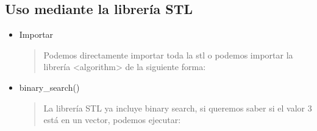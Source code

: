 \documentclass[letterpaper,10pt,spanish]{sphinxmanual}
\begin{document}
\subsection{Uso mediante la librería STL}
\label{\detokenize{busqueda/binaria:uso-mediante-la-libreria-stl}}\begin{itemize}
\item {} 
Importar
\begin{quote}

Podemos directamente importar toda la stl o podemos importar la
librería \textless{}algorithm\textgreater{} de la siguiente forma:
\end{quote}

\end{itemize}

\begin{sphinxVerbatim}[commandchars=\\\{\},numbers=left,firstnumber=1,stepnumber=1]
 
\end{sphinxVerbatim}
\begin{itemize}
\item {} 
binary\_search()
\begin{quote}

La librería STL ya incluye binary search, si queremos saber si el valor 3 está en un vector, podemos ejecutar:
\end{quote}

\end{itemize}

\begin{sphinxVerbatim}[commandchars=\\\{\},numbers=left,firstnumber=1,stepnumber=1]
 
     
    
 
    
\end{sphinxVerbatim}
\end{document}
